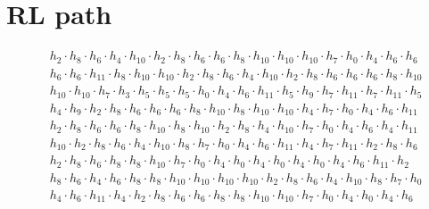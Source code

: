 
\section{RL path \label{app:RLpath}}

\[
\begin{aligned}
& h_{2} \cdot h_{8} \cdot h_{6} \cdot h_{4} \cdot h_{10} \cdot h_{2} \cdot h_{8} \cdot h_{6} \cdot h_{6} \cdot h_{8} \cdot h_{10} \cdot h_{10} \cdot h_{10} \cdot h_{7} \cdot h_{0} \cdot h_{4} \cdot h_{6} \cdot h_{6} \\ &
h_{6} \cdot h_{6} \cdot h_{11} \cdot h_{8} \cdot h_{10} \cdot h_{10} \cdot h_{2} \cdot h_{8} \cdot h_{6} \cdot h_{4} \cdot h_{10} \cdot h_{2} \cdot h_{8} \cdot h_{6} \cdot h_{6} \cdot h_{6} \cdot h_{8} \cdot h_{10} \\ &
h_{10} \cdot h_{10} \cdot h_{7} \cdot h_{3} \cdot h_{5} \cdot h_{5} \cdot h_{5} \cdot h_{0} \cdot h_{4} \cdot h_{6} \cdot h_{11} \cdot h_{5} \cdot h_{9} \cdot h_{7} \cdot h_{11} \cdot h_{7} \cdot h_{11} \cdot h_{5} \\ &
h_{4} \cdot h_{9} \cdot h_{2} \cdot h_{8} \cdot h_{6} \cdot h_{6} \cdot h_{6} \cdot h_{8} \cdot h_{10} \cdot h_{8} \cdot h_{10} \cdot h_{10} \cdot h_{4} \cdot h_{7} \cdot h_{0} \cdot h_{4} \cdot h_{6} \cdot h_{11} \\ &
h_{2} \cdot h_{8} \cdot h_{6} \cdot h_{6} \cdot h_{8} \cdot h_{10} \cdot h_{8} \cdot h_{10} \cdot h_{2} \cdot h_{8} \cdot h_{4} \cdot h_{10} \cdot h_{7} \cdot h_{0} \cdot h_{4} \cdot h_{6} \cdot h_{4} \cdot h_{11} \\ &
h_{10} \cdot h_{2} \cdot h_{8} \cdot h_{6} \cdot h_{4} \cdot h_{10} \cdot h_{8} \cdot h_{7} \cdot h_{0} \cdot h_{4} \cdot h_{6} \cdot h_{11} \cdot h_{4} \cdot h_{7} \cdot h_{11} \cdot h_{2} \cdot h_{8} \cdot h_{6} \\ &
h_{2} \cdot h_{8} \cdot h_{6} \cdot h_{8} \cdot h_{8} \cdot h_{10} \cdot h_{7} \cdot h_{0} \cdot h_{4} \cdot h_{0} \cdot h_{4} \cdot h_{0} \cdot h_{4} \cdot h_{0} \cdot h_{4} \cdot h_{6} \cdot h_{11} \cdot h_{2} \\ &
h_{8} \cdot h_{6} \cdot h_{4} \cdot h_{6} \cdot h_{8} \cdot h_{8} \cdot h_{10} \cdot h_{10} \cdot h_{10} \cdot h_{10} \cdot h_{2} \cdot h_{8} \cdot h_{6} \cdot h_{4} \cdot h_{10} \cdot h_{8} \cdot h_{7} \cdot h_{0} \\ &
h_{4} \cdot h_{6} \cdot h_{11} \cdot h_{4} \cdot h_{2} \cdot h_{8} \cdot h_{6} \cdot h_{6} \cdot h_{8} \cdot h_{8} \cdot h_{10} \cdot h_{10} \cdot h_{7} \cdot h_{0} \cdot h_{4} \cdot h_{0} \cdot h_{4} \cdot h_{6} \\ &

\end{aligned}\]
